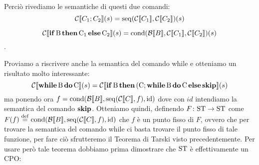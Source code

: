 Perciò rivediamo le semantiche di questi due comandi:
$$ \mathcal{C} \llbracket C_1 ; C_2 \rrbracket (s) = \mathrm{seq}(\mathcal{C} \llbracket C_1 \rrbracket, \mathcal{C} \llbracket C_2 \rrbracket)(s)$$

$$\mathcal{C} \llbracket \mathop{\textup{\textbf{if}}}\mathrm{B}\mathop{\textup{\textbf{then}}}\mathrm{C_1}\mathop{\textup{\textbf{else}}}\mathrm{C_2} \rrbracket (s) = \mathrm{cond}(\mathcal{B} \llbracket B \rrbracket, \mathcal{C} \llbracket C_1 \rrbracket, \mathcal{C} \llbracket C_2 \rrbracket)(s)$$.

Proviamo a riscrivere anche la semantica del comando while e otteniamo un risultato molto interessante:
$$ \mathcal{C} \llbracket \mathop{\textup{\textbf{while}}}\mathrm{B}\mathop{\textup{\textbf{do}}}\mathrm{C} \rrbracket (s) = \mathcal{C} \llbracket \mathop{\textup{\textbf{if}}}\mathrm{B}\mathop{\textup{\textbf{then}}}\mathrm{(C ; \mathop{\textup{\textbf{while}}}\mathrm{B}\mathop{\textup{\textbf{do}}}\mathrm{C}}\mathop{\textup{\textbf{else}}}\mathrm{\mathop{\textup{\textbf{skip}}}} \rrbracket (s)$$
ma ponendo ora $f = \mathrm{cond}(\mathcal{B} \llbracket B \rrbracket, \mathrm{seq}(\mathcal{C} \llbracket C \rrbracket, f), \mathrm{id})$ dove con $id$ intendiamo la semantica del comando $\mathop{\textup{\textbf{skip}}}$.
Otteniamo quindi, definendo $\mathord{F}\colon\mathrm{ST}\to\mathrm{ST}$ come $F(f) \defeq \mathrm{cond}(\calB \llbracket B \rrbracket, \mathrm{seq}(\calC \llbracket C \rrbracket, f), \mathrm{id})$ che $f$ è un punto fisso di $F$, ovvero che per trovare la semantica del comando while ci basta trovare il punto fisso di tale funzione, per fare ciò sfrutteremo il Teorema di Tarski visto precedentemente. Per usare però tale teorema dobbiamo prima dimostrare che $\mathrm{ST}$ è effettivamente un CPO:

